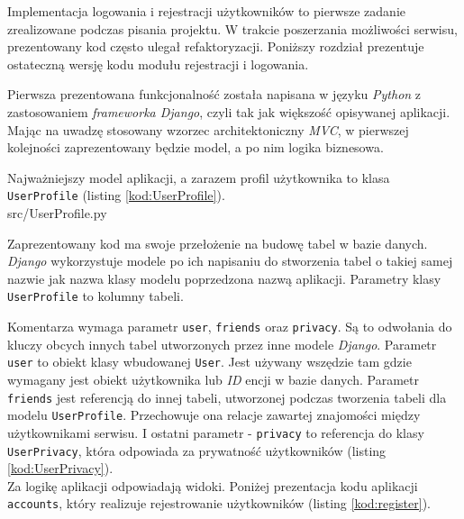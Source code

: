Implementacja logowania i rejestracji użytkowników to pierwsze zadanie zrealizowane podczas pisania projektu. W trakcie poszerzania możliwości serwisu, prezentowany kod często ulegał refaktoryzacji. Poniższy rozdział prezentuje ostateczną wersję kodu modułu rejestracji i logowania.

Pierwsza prezentowana funkcjonalność została napisana w języku \emph{Python} z zastosowaniem \emph{frameworka Django}, czyli tak jak większość opisywanej aplikacji. Mając na uwadzę stosowany wzorzec architektoniczny \emph{MVC}, w pierwszej kolejności zaprezentowany będzie model, a po nim logika biznesowa.

Najważniejszy model aplikacji, a zarazem profil użytkownika to klasa \texttt{UserProfile} (listing \ref{kod:UserProfile}).\\


  {src/UserProfile.py}

\vspace{1em}
Zaprezentowany kod ma swoje przełożenie na budowę tabel w bazie danych. \emph{Django} wykorzystuje modele po ich napisaniu do stworzenia tabel o takiej samej nazwie jak nazwa klasy modelu poprzedzona nazwą aplikacji. Parametry klasy \texttt{UserProfile} to kolumny tabeli.

Komentarza wymaga parametr \texttt{user}, \texttt{friends}
oraz 
\texttt{privacy}. 
Są to odwołania do kluczy obcych innych tabel utworzonych przez inne modele \emph{Django}. Parametr \texttt{user} to obiekt klasy wbudowanej \texttt{User}. Jest używany wszędzie tam gdzie wymagany jest obiekt użytkownika lub \emph{ID} encji w bazie danych. Parametr \texttt{friends} jest referencją do innej tabeli, utworzonej podczas tworzenia tabeli dla modelu \texttt{UserProfile}. Przechowuje ona relacje zawartej znajomości między użytkownikami serwisu. I ostatni parametr - \texttt{privacy} to referencja do klasy \texttt{UserPrivacy}, która odpowiada za prywatność użytkowników (listing \ref{kod:UserPrivacy}).\\



\vspace{1em}
Za logikę aplikacji odpowiadają widoki. Poniżej prezentacja kodu aplikacji \texttt{accounts}, który realizuje rejestrowanie użytkowników (listing \ref{kod:register}). \\

